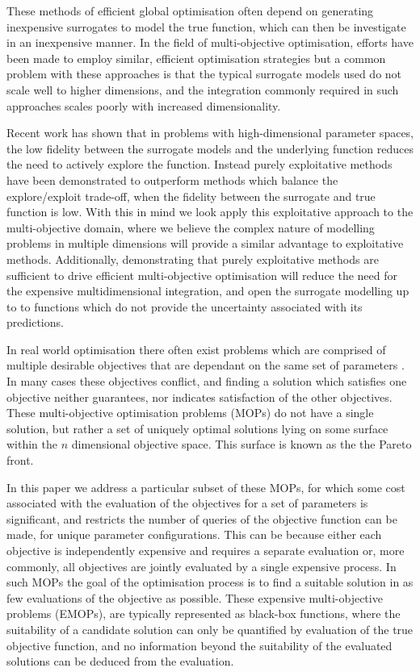 \documentclass[runningheads]{llncs}
\begin{document}
These methods of efficient global optimisation often depend on generating inexpensive surrogates to model the true function, which can then be investigate in an inexpensive manner. In the field of multi-objective optimisation, efforts have been made to employ similar, efficient optimisation strategies but a common problem with these approaches is that the typical surrogate models used do not scale well to higher dimensions, and the integration commonly required in such approaches scales poorly with increased dimensionality. 

Recent work has shown that in problems with high-dimensional parameter spaces, the low fidelity between the surrogate models and the underlying function reduces the need to actively explore the function. Instead purely exploitative methods have been demonstrated to outperform methods which balance the explore/exploit trade-off, when the fidelity between the surrogate and true function is low. With this in mind we look apply this exploitative approach to the multi-objective domain, where we believe the complex nature of modelling problems in multiple dimensions will provide a similar advantage to exploitative methods. Additionally, demonstrating that purely exploitative methods are sufficient to drive efficient multi-objective optimisation will reduce the need for the expensive multidimensional integration, and open the surrogate modelling up to to functions which do not provide the uncertainty associated with its predictions. 

In real world optimisation there often exist problems which are comprised of multiple desirable objectives that are dependant on the same set of parameters \cite{marler2004survey}. In many cases these objectives conflict, and finding a solution which satisfies one objective neither guarantees, nor indicates satisfaction of the other objectives. These multi-objective optimisation problems (MOPs) do not have a single solution, but rather a set of uniquely optimal solutions lying on some surface within the $n$ dimensional objective space. This surface is known as the the Pareto front.

In this paper we address a particular subset of these MOPs, for which some cost associated with the evaluation of the objectives for a set of parameters is significant, and restricts the number of queries of the objective function can be made, for unique parameter configurations. This can be because either each objective is independently expensive and requires a separate evaluation or, more commonly, all objectives are jointly evaluated by a single expensive process. In such MOPs the goal of the optimisation process is to find a suitable solution in as few evaluations of the objective as possible. These expensive multi-objective problems (EMOPs), are typically represented as black-box functions, where the suitability of a candidate solution can only be quantified by evaluation of the true objective function, and no information beyond the suitability of the evaluated solutions can be deduced from the evaluation.   
\end{document}

